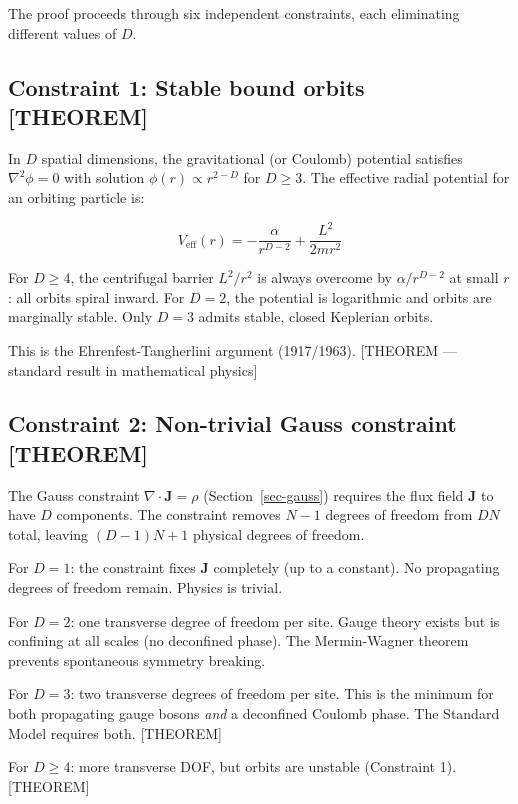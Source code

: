 \documentclass[
  11pt,
  letterpaper,
  twoside,
  openany]{book}
\makeatletter
\let\orig@subsection\subsection
\renewcommand{\subsection}{\needspace{6\baselineskip}\orig@subsection}
\makeatother
\begin{document}
The proof proceeds through six independent constraints, each eliminating
different values of \(D\).

\subsection{Constraint 1: Stable bound orbits
{[}THEOREM{]}}\label{constraint-1-stable-bound-orbits-theorem}

In \(D\) spatial dimensions, the gravitational (or Coulomb) potential
satisfies \(\nabla^2 \phi = 0\) with solution
\(\phi(r) \propto r^{2-D}\) for \(D \geq 3\). The effective radial
potential for an orbiting particle is:

\[
V_{\text{eff}}(r) = -\frac{\alpha}{r^{D-2}} + \frac{L^2}{2mr^2}
\]

For \(D \geq 4\), the centrifugal barrier \(L^2/r^2\) is always overcome
by \(\alpha/r^{D-2}\) at small \(r\): all orbits spiral inward. For
\(D = 2\), the potential is logarithmic and orbits are marginally
stable. Only \(D = 3\) admits stable, closed Keplerian orbits.

This is the Ehrenfest-Tangherlini argument (1917/1963). {[}THEOREM ---
standard result in mathematical physics{]}

\subsection{Constraint 2: Non-trivial Gauss constraint
{[}THEOREM{]}}\label{constraint-2-non-trivial-gauss-constraint-theorem}

The Gauss constraint \(\nabla \cdot \mathbf{J} = \rho\)
(Section~\ref{sec-gauss}) requires the flux field \(\mathbf{J}\) to have
\(D\) components. The constraint removes \(N - 1\) degrees of freedom
from \(DN\) total, leaving \((D-1)N + 1\) physical degrees of freedom.

For \(D = 1\): the constraint fixes \(\mathbf{J}\) completely (up to a
constant). No propagating degrees of freedom remain. Physics is trivial.

For \(D = 2\): one transverse degree of freedom per site. Gauge theory
exists but is confining at all scales (no deconfined phase). The
Mermin-Wagner theorem prevents spontaneous symmetry breaking.

For \(D = 3\): two transverse degrees of freedom per site. This is the
minimum for both propagating gauge bosons \emph{and} a deconfined
Coulomb phase. The Standard Model requires both. {[}THEOREM{]}

For \(D \geq 4\): more transverse DOF, but orbits are unstable
(Constraint 1). {[}THEOREM{]}
\end{document}
